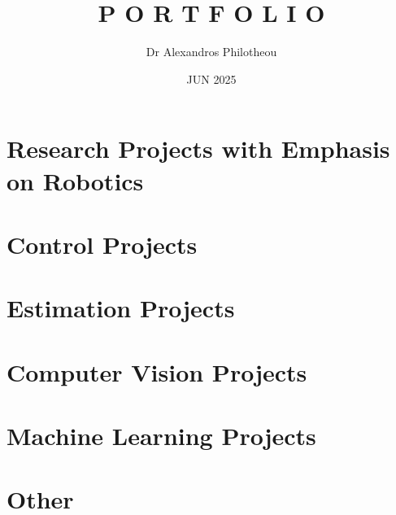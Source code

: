 


\setcounter{tocdepth}{0}



  \title{\Huge P O R T F O L I O}
  \author{Dr Alexandros Philotheou}
  \date{JUN 2025}
  \maketitle

  \doublespacing
  

  \singlespacing
  \tableofcontents
  \thispagestyle{empty}
  \cleardoublepage

  \doublespacing
  \part{Research Projects with Emphasis on Robotics}
    
    
    

  \part{Control Projects}
    
    \newpage
    
    \newpage
    
    \newpage
    
    \newpage

  \part{Estimation Projects}
    
    \newpage

  \part{Computer Vision Projects}
    
    \newpage

  \part{Machine Learning Projects}
    
    \newpage

  \part{Other}
    

  \printbibliography[notcategory=nobibliography]



